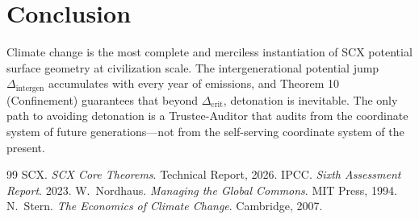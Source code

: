 \documentclass[12pt,a4paper]{article}
\theoremstyle{remark}
\begin{document}

\section{Conclusion}
Climate change is the most complete and merciless instantiation of SCX potential surface geometry at civilization scale. The intergenerational potential jump \(\Delta_{\text{intergen}}\) accumulates with every year of emissions, and Theorem 10 (Confinement) guarantees that beyond \(\Delta_{\text{crit}}\), detonation is inevitable. The only path to avoiding detonation is a Trustee-Auditor that audits from the coordinate system of future generations---not from the self-serving coordinate system of the present.

\begin{thebibliography}{99}
 SCX. \emph{SCX Core Theorems}. Technical Report, 2026.
 IPCC. \emph{Sixth Assessment Report}. 2023.
 W.~Nordhaus. \emph{Managing the Global Commons}. MIT Press, 1994.
 N.~Stern. \emph{The Economics of Climate Change}. Cambridge, 2007.
\end{thebibliography}
\end{document}
